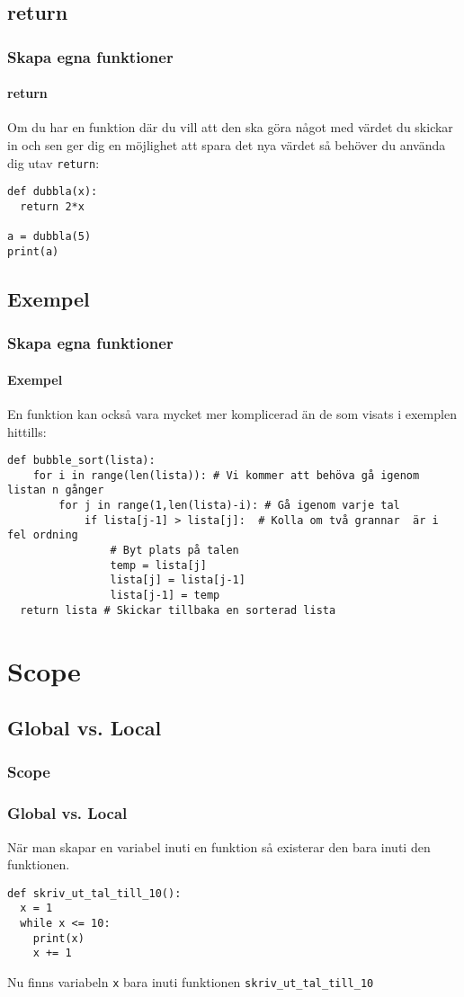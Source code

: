 \documentclass[aspectratio=169]{beamer}
\begin{document}
\subsection{return}

\begin{frame}[fragile]
	\frametitle{Skapa egna funktioner}
	\framesubtitle{return}
	
	Om du har en funktion där du vill att den ska göra något med värdet du skickar 
in och sen ger dig en möjlighet att spara det nya värdet så behöver du använda dig utav \lstinline{return}:

	\begin{lstlisting}
def dubbla(x):
  return 2*x

a = dubbla(5)
print(a)
	\end{lstlisting}
	
\end{frame}

\subsection{Exempel}

\begin{frame}[fragile]
	\frametitle{Skapa egna funktioner}
	\framesubtitle{Exempel}
	En funktion kan också vara mycket mer komplicerad än de som visats i exemplen hittills:
	
	\begin{lstlisting}
def bubble_sort(lista):
    for i in range(len(lista)): # Vi kommer att behöva gå igenom listan n gånger
        for j in range(1,len(lista)-i): # Gå igenom varje tal
            if lista[j-1] > lista[j]:  # Kolla om två grannar  är i fel ordning
                # Byt plats på talen
                temp = lista[j]
                lista[j] = lista[j-1]
                lista[j-1] = temp
  return lista # Skickar tillbaka en sorterad lista
	\end{lstlisting}
\end{frame}

\section{Scope}

\subsection{Global vs. Local}

\begin{frame}[fragile]
	\frametitle{Scope}
	\frametitle{Global vs. Local}
	
	När man skapar en variabel inuti en funktion så existerar den bara inuti den funktionen.

	\begin{lstlisting}
def skriv_ut_tal_till_10():
  x = 1
  while x <= 10:
    print(x)
    x += 1
	\end{lstlisting}

Nu finns variabeln \lstinline{x} bara inuti funktionen \lstinline{skriv_ut_tal_till_10}

\end{frame}
\end{document}
